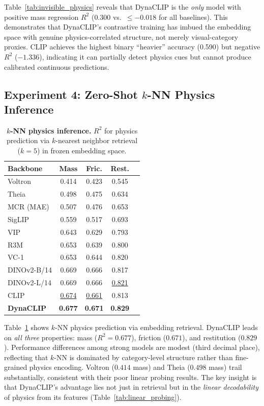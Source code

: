 \documentclass{article}
\newcommand{\methodname}{DynaCLIP}
\newcommand{\best}[1]{\textbf{#1}}
\newcommand{\second}[1]{\underline{#1}}
\begin{document}
Table~\ref{tab:invisible_physics} reveals that \methodname{} is the \emph{only} model with positive mass regression $R^2$ ($0.300$ vs.\ $\le -0.018$ for all baselines). This demonstrates that \methodname{}'s contrastive training has imbued the embedding space with genuine physics-correlated structure, not merely visual-category proxies. CLIP achieves the highest binary ``heavier'' accuracy (0.590) but negative $R^2$ ($-1.336$), indicating it can partially detect physics cues but cannot produce calibrated continuous predictions.


\subsection{Experiment 4: Zero-Shot $k$-NN Physics Inference}
\label{sec:exp_knn}

\begin{table}
\vspace{-1.5em}
\centering
\caption{\textbf{$k$-NN physics inference.} $R^2$ for physics prediction via $k$-nearest neighbor retrieval ($k{=}5$) in frozen embedding space.}
\label{tab:knn}
\small
\begin{tabular}{@{}lcccc@{}}
\toprule
\textbf{Backbone} & \textbf{Mass} & \textbf{Fric.} & \textbf{Rest.} \\
\midrule
Voltron & 0.414 & 0.423 & 0.545 \\
Theia & 0.498 & 0.475 & 0.634 \\
MCR (MAE) & 0.507 & 0.476 & 0.653 \\
SigLIP & 0.559 & 0.517 & 0.693 \\
VIP & 0.643 & 0.629 & 0.793 \\
R3M & 0.653 & 0.639 & 0.800 \\
VC-1 & 0.653 & 0.644 & 0.820 \\
DINOv2-B/14 & 0.669 & 0.666 & 0.817 \\
DINOv2-L/14 & 0.669 & 0.666 & \second{0.821} \\
CLIP & \second{0.674} & \second{0.661} & 0.813 \\
\midrule
\textbf{\methodname{}} & \best{0.677} & \best{0.671} & \best{0.829} \\
\bottomrule
\end{tabular}
\vspace{-1em}
\end{table}

Table~\ref{tab:knn} shows $k$-NN physics prediction via embedding retrieval. DynaCLIP leads on \emph{all three} properties: mass ($R^2{=}0.677$), friction ($0.671$), and restitution ($0.829$). Performance differences among strong models are modest (third decimal place), reflecting that $k$-NN is dominated by category-level structure rather than fine-grained physics encoding. Voltron ($0.414$ mass) and Theia ($0.498$ mass) trail substantially, consistent with their poor linear probing results. The key insight is that \methodname{}'s advantage lies not just in retrieval but in the \emph{linear decodability} of physics from its features (Table~\ref{tab:linear_probing}).
\end{document}
